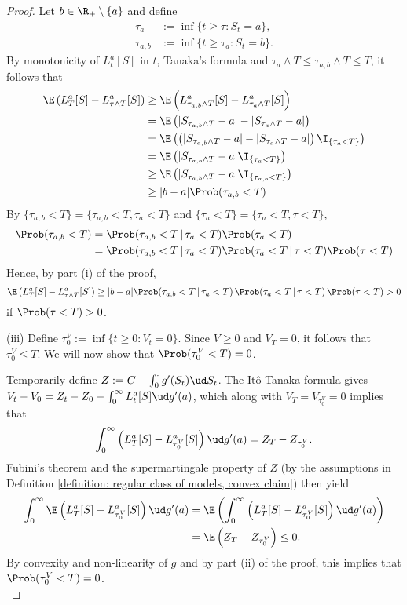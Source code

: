 \documentclass[11pt]{article}
\begin{document}
\begin{proof}
Let $b \in \R_+ \setminus \{ a \}$ and define
\begin{align*}
\tau_a &:= \inf \{ t \geq \tau : S_t = a \}, \\
\tau_{a,b} &:= \inf \{ t \geq \tau_a : S_t = b \}.
\end{align*}
By monotonicity of $L^a_t[S]$ in $t$, Tanaka's formula and $\tau_a \wedge T \leq \tau_{a,b} \wedge T \leq T$, it follows that
\begin{align*}
\E \left( L^a_T[S] - L^a_{\tau \wedge T}[S] \right) &\geq \E \left( L^a_{\tau_{a,b} \wedge T}[S] - L^a_{\tau_a \wedge T}[S] \right) \\
&= \E \left( |S_{\tau_{a,b} \wedge T} - a| - |S_{\tau_a \wedge T} - a| \right) \\
&= \E \left( \left( |S_{\tau_{a,b} \wedge T} - a| - |S_{\tau_a \wedge T} - a| \right) \I_{\{ \tau_a < T \}} \right) \\
&= \E \left( |S_{\tau_{a,b} \wedge T} - a| \I_{\{ \tau_a < T \}} \right) \\
&\geq \E \left( |S_{\tau_{a,b} \wedge T} - a| \I_{\{ \tau_{a,b} < T \}} \right) \\
&\geq |b-a| \Prob( \tau_{a,b} < T )
\end{align*}
By $\{ \tau_{a,b} < T \} = \{ \tau_{a,b} < T, \tau_a < T \}$ and $\{ \tau_a < T \} = \{ \tau_a < T, \tau < T \}$,
\begin{align*}
\Prob(\tau_{a,b} < T) &= \Prob(\tau_{a,b} < T \, | \, \tau_a < T) \Prob( \tau_a < T) \\
&= \Prob(\tau_{a,b} < T \, | \, \tau_a < T) \Prob( \tau_a < T \, | \, \tau < T ) \Prob(\tau < T)
\end{align*}
Hence, by part (i) of the proof,
$$
\E \left( L^a_T[S] - L^a_{\tau \wedge T}[S] \right) \geq |b-a| \Prob(\tau_{a,b} < T \, | \, \tau_a < T) \, \Prob( \tau_a < T \, | \, \tau < T ) \, \Prob(\tau < T) > 0
$$
if $\Prob (\tau < T) > 0$. \\

\item (iii) Define $\tau^V_0 := \inf \{ t \geq 0 : V_t = 0 \}$. Since $V \geq 0$ and $V_T = 0$, it follows that $\tau^V_0 \leq T$. We will now show that $\Prob(\tau^V_0 < T) = 0$.

Temporarily define $Z := C - \int_0^\cdot g^\prime(S_t) \ud S_t$. The It\^o-Tanaka formula gives $V_t - V_0 = Z_t - Z_0 - \int_0^\infty L^a_t[S] \ud g^\prime(a)$, which along with $V_T = V_{\tau^V_0} = 0$ implies that 
$$
\int_0^\infty \left( L^a_T[S] - L^a_{\tau^V_0}[S] \right) \ud g^\prime(a) = Z_T - Z_{\tau^V_0}.
$$
Fubini's theorem and the supermartingale property of $Z$ (by the assumptions in Definition \ref{definition: regular class of models, convex claim}) then yield
\begin{align*}
\int_0^\infty \E \left( L^a_T[S] - L^a_{\tau^V_0}[S] \right) \ud g^\prime(a) &= \E \left( \int_0^\infty \left( L^a_T[S] - L^a_{\tau^V_0}[S] \right) \ud g^\prime(a) \right) \\
&= \E \left( Z_T - Z_{\tau^V_0} \right) \leq 0.
\end{align*}
By convexity and non-linearity of $g$ and by part (ii) of the proof, this implies that $\Prob( \tau^V_0 < T ) = 0$. \\


\end{proof}
\end{document}
